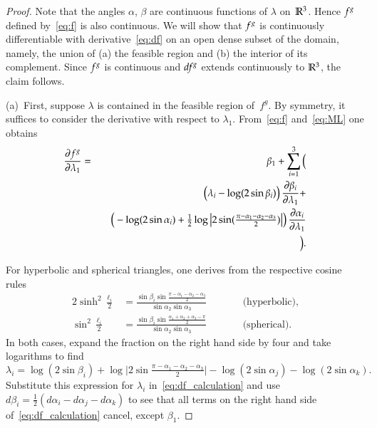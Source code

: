 \documentclass[Thesis]{subfiles}
\begin{document}
\begin{proof}
  Note that the angles $\alpha$, $\beta$ are continuous functions of
  $\lambda$ on~$\mathbb R^{3}$. Hence $f^{g}$ defined by~\eqref{eq:f} is
  also continuous. We will show that $f^{g}$ is continuously
  differentiable with derivative~\eqref{eq:df} on an open dense subset
  of the domain, namely, the union of (a) the feasible region and (b)
  the interior of its complement. Since $f^{g}$ is continuous and
  $\it df^{g}$ extends continuously to $\mathbb R^{3}$, the claim follows.

  (a)\, First, suppose $\lambda$ is contained in the feasible region
  of~$f^{g}$. By symmetry, it suffices to consider the derivative with
  respect to $\lambda_{1}$. From~\eqref{eq:f} and~\eqref{eq:ML} one
  obtains
  \begin{eqnarray}
    \frac{\partial f^{g}}{\partial\lambda_{1}} &=& \beta_{1} + \sum_{i=1}^{3}\Big(\nonumber\\
    &&\quad\big(\lambda_{i} - \log(2\sin\beta_{i})\big)\, \frac{\partial\beta_{i}}{\partial\lambda_{1}}+\label{eq:df_calculation}\\
    &&\quad\big(- \log(2\sin\alpha_{i})+\tfrac{1}{2}\log\big|2\sin(\tfrac{\pi-\alpha_{1}-\alpha_{2}-\alpha_{3}}{2})\big|\big)\,
    \frac{\partial\alpha_{i}}{\partial\lambda_{1}}\nonumber\\
    &&\Big).\nonumber
  \end{eqnarray}

  For hyperbolic and spherical triangles, one derives from the
  respective cosine rules
  \begin{alignat*}{2}
    \sinh^{2}\frac{\ell_{i}}{2} &= 
    \frac{
      \sin\beta_{i}
      \sin\frac{\pi-\alpha_{1}-\alpha_{2}-\alpha_{3}}{2}
    }{
      \sin\alpha_{2} \sin\alpha_{3}
    }
    &\qquad&\text{(hyperbolic),}\\
    \sin^{2}\frac{\ell_{i}}{2} &= 
    \frac{
      \sin\beta_{i}
      \sin\frac{\alpha_{1}+\alpha_{2}+\alpha_{3}-\pi}{2}
    }{
      \sin\alpha_{2} \sin\alpha_{3}
    }
    &\qquad&\text{(spherical).}
  \end{alignat*}
  In both cases, expand the fraction on the right hand side by four and
  take logarithms to find
  \begin{equation*}
    \lambda_{i}=\log(2\sin\beta_{i})
    +\log\big|2\sin\tfrac{\pi-\alpha_{1}-\alpha_{2}-\alpha_{3}}{2}\big|
    -\log(2\sin\alpha_{j})-\log(2\sin\alpha_{k}).
  \end{equation*}
  Substitute this expression for $\lambda_{i}$
  in~\eqref{eq:df_calculation} and use
  $d\beta_{i}=\tfrac{1}{2}(d\alpha_{i}-d\alpha_{j}-d\alpha_{k})$ to
  see that all terms on the right hand side
  of~\eqref{eq:df_calculation} cancel, except $\beta_{1}$.


\end{proof}
\end{document}
